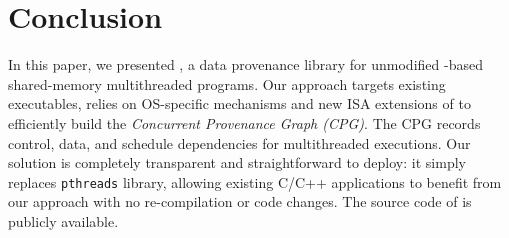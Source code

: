 \section{Conclusion}
\label{sec:conclusion}

In this paper, we presented \projecttitle, a data provenance library for unmodified \pthreads-based shared-memory multithreaded programs. Our approach targets existing executables, relies on OS-specific mechanisms and new ISA extensions of \intelpt  to efficiently build the {\em Concurrent Provenance Graph (CPG)}. The CPG records control, data, and schedule dependencies for multithreaded executions. Our solution is completely transparent and straightforward to deploy: it simply replaces {\tt pthreads} library, allowing existing C/C++ applications to benefit from our approach with no re-compilation or code changes.  The source code of \projecttitle is publicly available.

